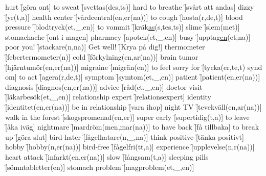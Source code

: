 \begin{questions}
\begin{multicols}{2}
        \question hurt \f[göra ont]
        \question to sweat \f[svettas(des,ts)]
        \question hard to breathe \f[svårt att andas]
        \question dizzy \f[yr(t,a)]
        \question health center \f[vårdcentral(en,er(na))]
        \question to cough \f[hosta(r,de,t)]
        \question blood pressure \f[blodtryck(et,\_,en)]
        \question to vommit \f[kräk\underline{as}(s,tes,ts)]
        \question slime \f[slem(met)]
        \question stomachache \f[ont i magen]
        \question pharmacy \f[apotek(et,\_,en)]
        \question busy \f[upptag\underline{en}(et,na)]
        \question poor you! \f[stackare(n,na)]
        \question Get well! \f[Krya på dig!]
        \question thermometer \f[febertermometer(n)]
        \question cold \f[förkylning(en,ar(na))]
        \question brain tumor \f[hjärntumör(en,er(na))]
        \question migraine \f[migrän(en)]
        \question to feel sorry for \f[tycka(er,te,t) synd om]
        \question to act \f[agera(r,de,t)]
        \question symptom \f[symtom(et,\_,en)]
        \question patient \f[patient(en,er(na))]
        \question diagnosis \f[diagnos(en,er(na))]
        \question advice \f[råd(et,\_,en)]
        \question doctor visit \f[läkarbesök(et,\_,en)]
        \question relationship expert \f[relationsexpert]
        \question identity \f[identitet(en,er(na))]
        \question be in relationship \f[vara ihop]
        \question night TV \f[tevekväll(en,ar(na))]
        \question walk in the forest \f[skogspromenad(en,er)]
        \question super early \f[supertidig(t,a)]
        \question to leave \f[åka iväg]
        \question nightmare \f[mardröm(men,mar(na))]
        \question to have back \f[få tillbaka]
        \question to break up \f[göra slut]
        \question bird-hater \f[fågelhatare(n,\_,na)]
        \question think positive \f[tänka positivt]
        \question hobby \f[hobby(n,er(na))]
        \question bird-free \f[fågelfri(tt,a)]
        \question experience \f[upplevelse(n,r(na))]
        \question heart attack \f[infarkt(en,er(na))]
        \question slow \f[långsam(t,a)]
        \question sleeping pills \f[sömntabletter(en)]
        \question stomach problem \f[magproblem(et,\_,en)]
    \end{multicols}
\end{questions}
